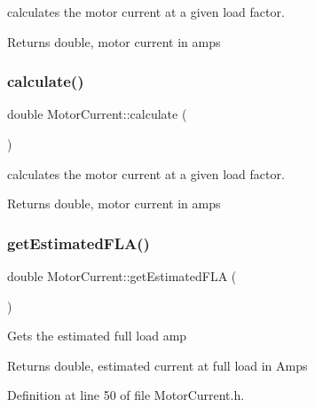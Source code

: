 calculates the motor current at a given load factor. \begin{DoxyReturn}{Returns}
double, motor current in amps 
\end{DoxyReturn}
\mbox{\label{class_motor_current_a18e545d2c82f1fe247cc501eda2ce857}} 
\subsubsection{\texorpdfstring{calculate()}{calculate()}\hspace{0.1cm}{\footnotesize\ttfamily [3/3]}}
{\footnotesize\ttfamily double Motor\+Current\+::calculate (\begin{DoxyParamCaption}{ }\end{DoxyParamCaption})}

calculates the motor current at a given load factor. \begin{DoxyReturn}{Returns}
double, motor current in amps 
\end{DoxyReturn}
\mbox{\label{class_motor_current_a0f845ec03585b21a8e476ed3e63f365f}} 
\subsubsection{\texorpdfstring{get\+Estimated\+F\+L\+A()}{getEstimatedFLA()}\hspace{0.1cm}{\footnotesize\ttfamily [1/3]}}
{\footnotesize\ttfamily double Motor\+Current\+::get\+Estimated\+F\+LA (\begin{DoxyParamCaption}{ }\end{DoxyParamCaption})\hspace{0.3cm}{\ttfamily [inline]}}

Gets the estimated full load amp

\begin{DoxyReturn}{Returns}
double, estimated current at full load in Amps 
\end{DoxyReturn}


Definition at line 50 of file Motor\+Current.\+h.

\mbox{\label{class_motor_current_a0f845ec03585b21a8e476ed3e63f365f}} 
